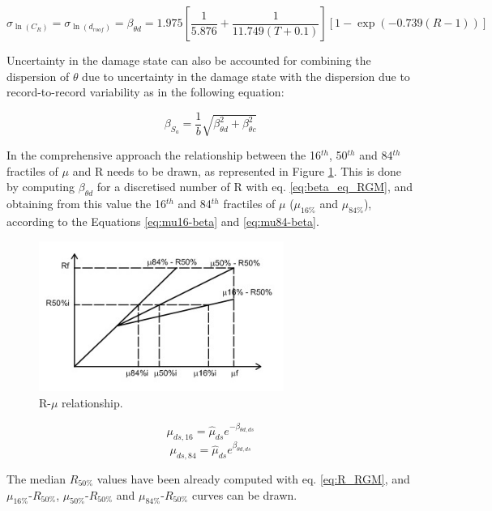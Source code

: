 \begin{equation}
\sigma_{\ln(C_R)} = \sigma_{\ln(d_{roof})} = \beta_{\theta d} =  1.975 [\frac{1}{5.876} + \frac{1}{11.749 (T + 0.1)}] [1- \exp(-0.739 (R - 1))]
\label{eq:beta_eq_RGM}
\end{equation}

Uncertainty in the damage state can also be accounted for combining the dispersion of $\theta$ due to uncertainty in the damage state with the dispersion due to record-to-record variability as in the following equation:

\begin{equation}
\beta_{S_a} = \frac{1}{b} \sqrt{\beta_{\theta d}^2 + \beta_{\theta c}^2}
\label{eq:betaStot_RGM}
\end{equation}

In the comprehensive approach the relationship between the 16$^{th}$, 50$^{th}$ and 84$^{th}$ fractiles of $\mu$ and R needs to be drawn, as represented in Figure \ref{fig:Rmu}. This is done by computing $\beta_{\theta d}$ for a discretised number of R with eq. \ref{eq:beta_eq_RGM}, and obtaining from this value the 16$^{th}$ and 84$^{th}$ fractiles of $\mu$ ($\mu_{16\%}$ and $\mu_{84\%}$), according to the Equations \ref{eq:mu16-beta} and \ref{eq:mu84-beta}.

\begin{figure}[!htbp]
\centering
\includegraphics[width=8cm]{./figures/Rmu.jpg}
\caption{R-$\mu$ relationship.}
\label{fig:Rmu}
\end{figure}

\begin{equation}
\mu_{ds,16} = \hat{\mu}_{ds} e^{-\beta_{\theta d,ds}}
\label{eq:mu16-beta}
\end{equation}
\begin{equation}
\mu_{ds,84} = \hat{\mu}_{ds} e^{\beta_{\theta d,ds}}
\label{eq:mu84-beta}
\end{equation}

The median $R_{50\%}$ values have been already computed with eq. \ref{eq:R_RGM}, and $\mu_{16\%}$-$R_{50\%}$, $\mu_{50\%}$-$R_{50\%}$ and $\mu_{84\%}$-$R_{50\%}$ curves can be drawn.

